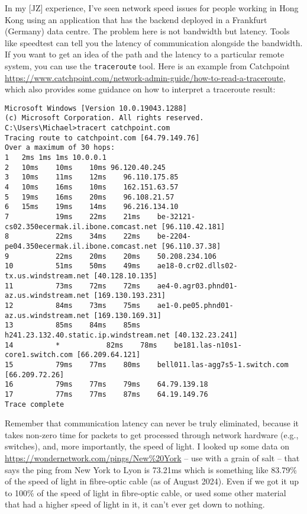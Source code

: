 In my [JZ] experience, I've seen network speed issues for people working in Hong Kong using an application that has the backend deployed in a Frankfurt (Germany) data centre. The problem here is not bandwidth but latency. Tools like speedtest can tell you the latency of communication alongside the bandwidth. If you want to get an idea of the path and the latency to a particular remote system, you can use the \texttt{traceroute} tool. Here is an example from Catchpoint \url{https://www.catchpoint.com/network-admin-guide/how-to-read-a-traceroute}, which also provides some guidance on how to interpret a traceroute result: 

{\scriptsize
\begin{verbatim}
Microsoft Windows [Version 10.0.19043.1288]
(c) Microsoft Corporation. All rights reserved.
C:\Users\Michael>tracert catchpoint.com
Tracing route to catchpoint.com [64.79.149.76]
Over a maximum of 30 hops: 
1	2ms	1ms	1ms 10.0.0.1
2 	10ms	10ms	10ms 96.120.40.245
3	10ms	11ms	12ms	96.110.175.85
4	10ms	16ms	10ms 	162.151.63.57
5	19ms	16ms	20ms	96.108.21.57
6	15ms	19ms	14ms	96.216.134.10
7          	19ms 	22ms 	21ms 	be-32121-cs02.350ecermak.il.ibone.comcast.net [96.110.42.181]
8          	22ms 	34ms 	22ms 	be-2204-pe04.350ecermak.il.ibone.comcast.net [96.110.37.38]
9          	22ms 	20ms 	20ms 	50.208.234.106
10       	51ms 	50ms 	49ms 	ae18-0.cr02.dlls02-tx.us.windstream.net [40.128.10.135]
11       	73ms 	72ms 	72ms 	ae4-0.agr03.phnd01-az.us.windstream.net [169.130.193.231]
12       	84ms 	73ms 	75ms 	ae1-0.pe05.phnd01-az.us.windstream.net [169.130.169.31]
13       	85ms 	84ms 	85ms 	h241.23.132.40.static.ip.windstream.net [40.132.23.241]
14       	*         	82ms 	78ms 	be181.las-n10s1-core1.switch.com [66.209.64.121]
15       	79ms 	77ms 	80ms 	bell011.las-agg7s5-1.switch.com [66.209.72.26]
16       	79ms 	77ms 	79ms 	64.79.139.18
17       	77ms 	77ms 	87ms 	64.19.149.76
Trace complete
\end{verbatim}
}

Remember that communication latency can never be truly eliminated, because it takes non-zero time for packets to get processed through network hardware (e.g., switches), and, more importantly, the speed of light. I looked up some data on \url{https://wondernetwork.com/pings/New\%20York} -- use with a grain of salt --  that says the ping from New York to Lyon is 73.21ms which is something like 83.79\% of the speed of light in fibre-optic cable (as of August 2024). Even if we got it up to 100\% of the speed of light in fibre-optic cable, or used some other material that had a higher speed of light in it, it can't ever get down to nothing. 

